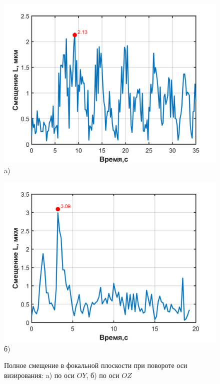  
 \begin{figure}[!h]
 	\begin{minipage}[b][][b]{0.49\linewidth}\centering
 		\includegraphics[width=1\linewidth]{matlab/img/LmaxY.png} \\ a)
 	\end{minipage}
 	\hfill
 	\begin{minipage}[b][][b]{0.49\linewidth}\centering
 		\includegraphics[width=1\linewidth]{matlab/img/LmaxZ.png} \\ б)
 	\end{minipage}
 	\caption{Полное смещение в фокальной плоскости при повороте оси визирования: a) по оси $OY$, б) по оси $OZ$ }
 	\label{fig:biasL}
 \end{figure}
 
